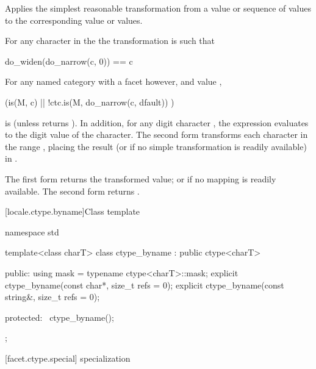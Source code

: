 \begin{itemdescr}
\pnum
\effects
Applies the simplest reasonable transformation from a
value or sequence of
values to the corresponding
value or values.

For any character  in the
the transformation is such that
\begin{codeblock}
do_widen(do_narrow(c, 0)) == c
\end{codeblock}

For any named
category with a
facet  however, and
value ,
\begin{codeblock}
(is(M, c) || !ctc.is(M, do_narrow(c, dfault)) )
\end{codeblock}
is
(unless
returns
).
In addition, for any digit character ,
the expression
evaluates to the digit value of the character.
The second form transforms each character
in the range
,
placing the result (or 
if no simple transformation is readily available) in
.

\pnum
\returns
The first form returns the transformed value; or 
if no mapping is readily available.
The second form returns .
\end{itemdescr}

[locale.ctype.byname]{Class template }

%
\begin{codeblock}
namespace std {
  template<class charT>
    class ctype_byname : public ctype<charT> {
    public:
      using mask = typename ctype<charT>::mask;
      explicit ctype_byname(const char*, size_t refs = 0);
      explicit ctype_byname(const string&, size_t refs = 0);

    protected:
      ~ctype_byname();
    };
}
\end{codeblock}

[facet.ctype.special]{ specialization}

